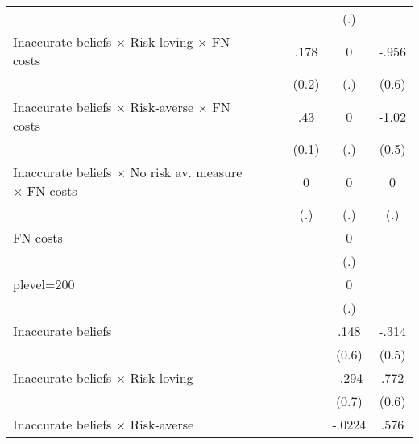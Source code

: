 \begin{table}[htbp]
\begin{tabular}{l*{5}{c}}
                &                  &                  &                  &      (.)         &                  \\
Inaccurate beliefs $\times$ Risk-loving $\times$ FN costs&                  &                  &     .178         &        0         &    -.956\sym{*}  \\
                &                  &                  &    (0.2)         &      (.)         &    (0.6)         \\
Inaccurate beliefs $\times$ Risk-averse $\times$ FN costs&                  &                  &      .43\sym{***}&        0         &    -1.02\sym{*}  \\
                &                  &                  &    (0.1)         &      (.)         &    (0.5)         \\
Inaccurate beliefs $\times$ No risk av. measure $\times$ FN costs&                  &                  &        0         &        0         &        0         \\
                &                  &                  &      (.)         &      (.)         &      (.)         \\
FN costs        &                  &                  &                  &        0         &                  \\
                &                  &                  &                  &      (.)         &                  \\
plevel=200      &                  &                  &                  &        0         &                  \\
                &                  &                  &                  &      (.)         &                  \\
Inaccurate beliefs&                  &                  &                  &     .148         &    -.314         \\
                &                  &                  &                  &    (0.6)         &    (0.5)         \\
Inaccurate beliefs $\times$ Risk-loving&                  &                  &                  &    -.294         &     .772         \\
                &                  &                  &                  &    (0.7)         &    (0.6)         \\
Inaccurate beliefs $\times$ Risk-averse&                  &                  &                  &   -.0224         &     .576         \\

\end{tabular}
\end{table}
